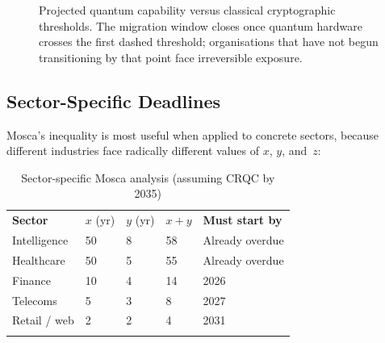 \begin{figure}[t]
\centering
{}
\caption{Projected quantum capability versus classical cryptographic thresholds.  The migration window closes once quantum hardware crosses the first dashed threshold; organisations that have not begun transitioning by that point face irreversible exposure.}
\label{fig:ch13-migration-timeline}
\end{figure}

\subsection{Sector-Specific Deadlines}
\label{subsec:sector-deadlines}

Mosca's inequality is most useful when applied to concrete sectors, because different industries face radically different values of $x$, $y$, and~$z$:

\begin{table}[t]
\caption{Sector-specific Mosca analysis (assuming CRQC by 2035)}
\label{tab:sector-mosca}
\begin{tabular}{p{3cm}p{1.5cm}p{1.5cm}p{1.5cm}p{3.5cm}}
\hline\noalign{\smallskip}
\textbf{Sector} & $x$ (yr) & $y$ (yr) & $x+y$ & \textbf{Must start by} \\
\noalign{\smallskip}\svhline\noalign{\smallskip}
Intelligence & 50 & 8 & 58 & Already overdue \\
Healthcare & 50 & 5 & 55 & Already overdue \\
Finance & 10 & 4 & 14 & 2026 \\
Telecoms & 5 & 3 & 8 & 2027 \\
Retail / web & 2 & 2 & 4 & 2031 \\
\noalign{\smallskip}\hline
\end{tabular}
\end{table}

